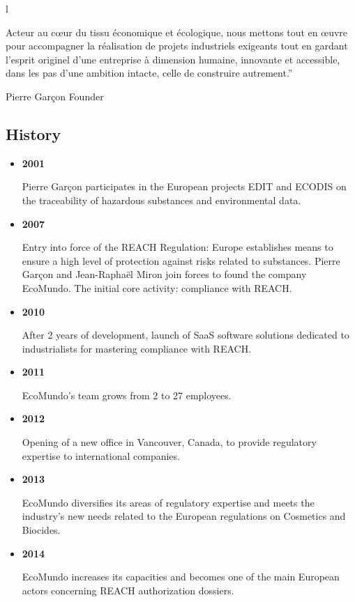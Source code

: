 l\documentclass[a4paper,12pt,twoside]{report}
\begin{document}
Acteur au cœur du tissu économique et écologique, nous mettons tout en œuvre pour accompagner la réalisation de projets industriels exigeants tout en gardant l’esprit originel d’une entreprise à dimension humaine, innovante et accessible, dans les pas d’une ambition intacte, celle de construire autrement.”


Pierre Garçon
Founder

\subsection{History}
\begin{itemize}
\item \textbf{2001}

Pierre Garçon participates in the European projects EDIT and ECODIS on the traceability of hazardous substances and environmental data.

\item \textbf{2007}

Entry into force of the REACH Regulation: Europe establishes means to ensure a high level of protection against risks related to substances. Pierre Garçon and Jean-Raphaël Miron join forces to found the company EcoMundo. The initial core activity: compliance with REACH.

\item \textbf{2010}

After 2 years of development, launch of SaaS software solutions dedicated to industrialists for mastering compliance with REACH.

\item \textbf{2011}

EcoMundo's team grows from 2 to 27 employees.

\item \textbf{2012}

Opening of a new office in Vancouver, Canada, to provide regulatory expertise to international companies.

\item \textbf{2013}

EcoMundo diversifies its areas of regulatory expertise and meets the industry's new needs related to the European regulations on Cosmetics and Biocides.

\item \textbf{2014}

EcoMundo increases its capacities and becomes one of the main European actors concerning REACH authorization dossiers.


\end{itemize}
\end{document}
